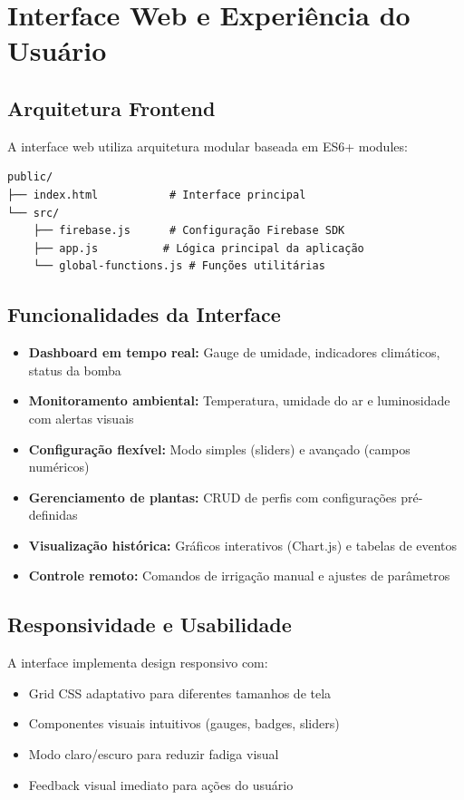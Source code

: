 \documentclass[twoside,english,brazilian]{UNISINOSmonografia}
\begin{document}
\section{Interface Web e Experiência do Usuário}

\subsection{Arquitetura Frontend}
A interface web utiliza arquitetura modular baseada em ES6+ modules:

\begin{verbatim}
public/
├── index.html           # Interface principal
└── src/
    ├── firebase.js      # Configuração Firebase SDK
    ├── app.js          # Lógica principal da aplicação
    └── global-functions.js # Funções utilitárias
\end{verbatim}

\subsection{Funcionalidades da Interface}
\begin{itemize}
    \item \textbf{Dashboard em tempo real:} Gauge de umidade, indicadores climáticos, status da bomba
    \item \textbf{Monitoramento ambiental:} Temperatura, umidade do ar e luminosidade com alertas visuais
    \item \textbf{Configuração flexível:} Modo simples (sliders) e avançado (campos numéricos)
    \item \textbf{Gerenciamento de plantas:} CRUD de perfis com configurações pré-definidas
    \item \textbf{Visualização histórica:} Gráficos interativos (Chart.js) e tabelas de eventos
    \item \textbf{Controle remoto:} Comandos de irrigação manual e ajustes de parâmetros
\end{itemize}

\subsection{Responsividade e Usabilidade}
A interface implementa design responsivo com:
\begin{itemize}
    \item Grid CSS adaptativo para diferentes tamanhos de tela
    \item Componentes visuais intuitivos (gauges, badges, sliders)
    \item Modo claro/escuro para reduzir fadiga visual
    \item Feedback visual imediato para ações do usuário
\end{itemize}
\end{document}

